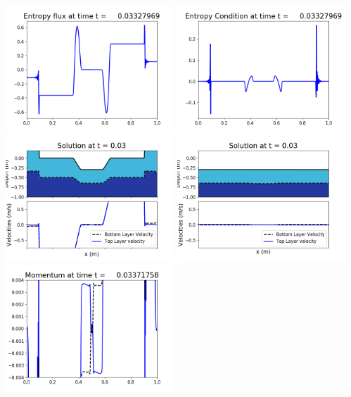 \documentclass[11pt]{article}
\begin{document}
\includegraphics[width=0.475\textwidth]{frame0077fig1008.png}
\vskip 10pt 
\includegraphics[width=0.475\textwidth]{frame0077fig1009.png}
\vskip 10pt 
\includegraphics[width=0.475\textwidth]{frame0078fig1001.png}
\includegraphics[width=0.475\textwidth]{frame0078fig1002.png}
\vskip 10pt 
\includegraphics[width=0.475\textwidth]{frame0078fig1003.png}
\end{document}
